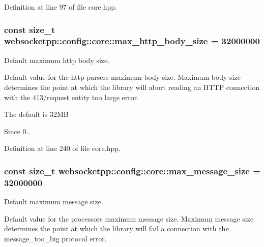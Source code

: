 Definition at line 97 of file core.\+hpp.

\hypertarget{structwebsocketpp_1_1config_1_1core_a4836b30dbc83db465f44aabae4e8ef55}{}
\subsubsection[{max\+\_\+http\+\_\+body\+\_\+size}]{\setlength{\rightskip}{0pt plus 5cm}const size\+\_\+t websocketpp\+::config\+::core\+::max\+\_\+http\+\_\+body\+\_\+size = 32000000\hspace{0.3cm}{\ttfamily [static]}}\label{structwebsocketpp_1_1config_1_1core_a4836b30dbc83db465f44aabae4e8ef55}


Default maximum http body size. 

Default value for the http parser\textquotesingle{}s maximum body size. Maximum body size determines the point at which the library will abort reading an H\+T\+T\+P connection with the 413/request entity too large error.

The default is 32\+M\+B

\begin{DoxySince}{Since}
0.. 
\end{DoxySince}


Definition at line 240 of file core.\+hpp.

\hypertarget{structwebsocketpp_1_1config_1_1core_a54875ed41a1d11149c684f9467b2e0d5}{}
\subsubsection[{max\+\_\+message\+\_\+size}]{\setlength{\rightskip}{0pt plus 5cm}const size\+\_\+t websocketpp\+::config\+::core\+::max\+\_\+message\+\_\+size = 32000000\hspace{0.3cm}{\ttfamily [static]}}\label{structwebsocketpp_1_1config_1_1core_a54875ed41a1d11149c684f9467b2e0d5}


Default maximum message size. 

Default value for the processor\textquotesingle{}s maximum message size. Maximum message size determines the point at which the library will fail a connection with the message\+\_\+too\+\_\+big protocol error.

